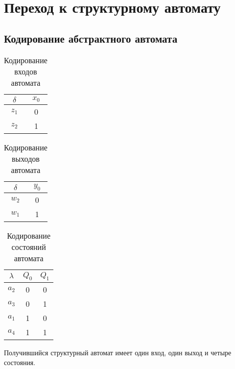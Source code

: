 \documentclass[a4paper,10pt]{article}
\begin{document}
\section*{Переход к структурному автомату}
    \subsection*{Кодирование абстрактного автомата}
        \begin{table}[h!]
            \center
            \begin{tabular}{|c|c|}
                \hline
                  $\delta$ & $x_0$ \\ \hline
                    $z_1$  &   0   \\ \hline
                    $z_2$  &   1   \\ \hline
            \end{tabular}
            \caption{Кодирование входов автомата}
        \end{table}
        \begin{table}[h!]
            \center
            \begin{tabular}{|c|c|}
                \hline
                  $\delta$ & $y_0$ \\ \hline
                    $w_2$  &   0   \\ \hline
                    $w_1$  &   1   \\ \hline
            \end{tabular}
            \caption{Кодирование выходов автомата}
        \end{table}

        \begin{table}[h!]
            \center
            \begin{tabular}{|c|c|c|}
                \hline
                  $\lambda$ & $Q_0$ & $Q_1$ \\ \hline
                    $a_2$  &   0   &   0   \\ \hline
                    $a_3$  &   0   &   1   \\ \hline
                    $a_1$  &   1   &   0   \\ \hline
                    $a_4$  &   1   &   1   \\ \hline
            \end{tabular}
            \caption{Кодирование состояний автомата}
        \end{table}

        Получившийся структурный автомат имеет один вход, один выход и четыре состояния. \\
\end{document}
